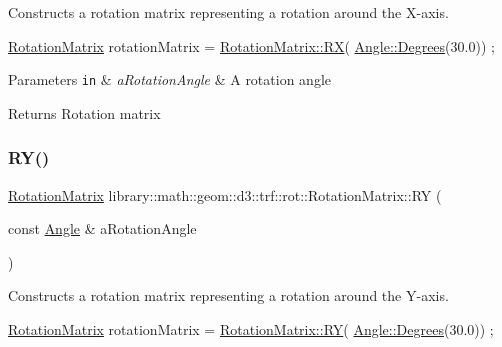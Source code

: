 Constructs a rotation matrix representing a rotation around the X-\/axis. 


\begin{DoxyCode}
\hyperlink{classlibrary_1_1math_1_1geom_1_1d3_1_1trf_1_1rot_1_1_rotation_matrix_a7f1184694020cb4f963d58931324ab06}{RotationMatrix} rotationMatrix = \hyperlink{classlibrary_1_1math_1_1geom_1_1d3_1_1trf_1_1rot_1_1_rotation_matrix_a69fee7be102205645581ed5d26c90b21}{RotationMatrix::RX}(
      \hyperlink{classlibrary_1_1math_1_1geom_1_1_angle_a64aa53e8420aeb6f671d86c65c370bc8}{Angle::Degrees}(30.0)) ;
\end{DoxyCode}



\begin{DoxyParams}[1]{Parameters}
\mbox{\tt in}  & {\em a\+Rotation\+Angle} & A rotation angle \\
\hline
\end{DoxyParams}
\begin{DoxyReturn}{Returns}
Rotation matrix 
\end{DoxyReturn}
\mbox{\label{classlibrary_1_1math_1_1geom_1_1d3_1_1trf_1_1rot_1_1_rotation_matrix_a4aa94a9e709365c4beeeb011be81a5fb}} 
\subsubsection{\texorpdfstring{R\+Y()}{RY()}}
{\footnotesize\ttfamily \hyperlink{classlibrary_1_1math_1_1geom_1_1d3_1_1trf_1_1rot_1_1_rotation_matrix}{Rotation\+Matrix} library\+::math\+::geom\+::d3\+::trf\+::rot\+::\+Rotation\+Matrix\+::\+RY (\begin{DoxyParamCaption}\item[{const \hyperlink{classlibrary_1_1math_1_1geom_1_1_angle}{Angle} \&}]{a\+Rotation\+Angle }\end{DoxyParamCaption})\hspace{0.3cm}{\ttfamily [static]}}



Constructs a rotation matrix representing a rotation around the Y-\/axis. 


\begin{DoxyCode}
\hyperlink{classlibrary_1_1math_1_1geom_1_1d3_1_1trf_1_1rot_1_1_rotation_matrix_a7f1184694020cb4f963d58931324ab06}{RotationMatrix} rotationMatrix = \hyperlink{classlibrary_1_1math_1_1geom_1_1d3_1_1trf_1_1rot_1_1_rotation_matrix_a4aa94a9e709365c4beeeb011be81a5fb}{RotationMatrix::RY}(
      \hyperlink{classlibrary_1_1math_1_1geom_1_1_angle_a64aa53e8420aeb6f671d86c65c370bc8}{Angle::Degrees}(30.0)) ;
\end{DoxyCode}



